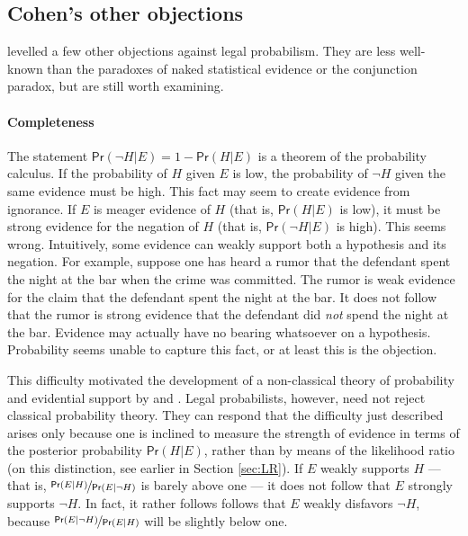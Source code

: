 \documentclass{article}
\newcommand{\pr}{\mathsf{Pr}}
\begin{document}
 
 
























\subsection{Cohen's other objections}


\cite{Cohen1977The-probable-an} levelled a few other objections against legal probabilism. They are less well-known than the paradoxes of naked statistical evidence or the conjunction paradox, but are still worth examining. 



 
 


\paragraph{Completeness}

The statement $\pr(\neg H\vert E) = 1-\pr(H\vert E)$ is a theorem of the probability calculus. If the probability of $H$ given $E$ is low, the probability of $\neg H$ given the same evidence must be high. 
This fact may seem to create evidence from ignorance. If $E$ is meager evidence of $H$ (that is, $\pr(H \vert E)$ is low), it must be strong evidence for the negation of $H$ (that is, $\pr(\neg H \vert E)$ is high). This seems wrong. Intuitively, some evidence can weakly support both a hypothesis and its negation.  For example, suppose one has heard a rumor that the defendant spent the night at the bar when the crime was committed. The rumor is weak evidence for the claim that the defendant spent the night at the bar. It does not follow that the rumor is strong evidence that the defendant did \textit{not} spend the night at the bar. Evidence may actually have no bearing whatsoever on a hypothesis. Probability seems unable to capture this fact, or at least this is the objection.  

This difficulty motivated the development of a non-classical theory of probability and evidential support by \citet{dempster1968Generalization} and \citet{shafer1976mathematical}.
Legal probabilists, however, need not reject classical probability theory. They can respond that the difficulty just described arises only 
because one is inclined to measure  the strength of evidence in terms of the posterior probability $\pr(H \vert E)$,  rather than by means of   the likelihood ratio (on this distinction, see earlier in Section \ref{sec:LR}).
If $E$ weakly supports $H$ ---that is, $\nicefrac{\pr(E \vert H)}{\pr(E \vert \neg H)}$ is barely above one --- it does not follow that $E$ strongly supports $\neg H$. In fact, it rather follows follows that $E$ weakly disfavors $\neg H$, because $\nicefrac{\pr(E \vert \neg H)}{\pr(E \vert H)}$ will be slightly below one. 
\end{document}
